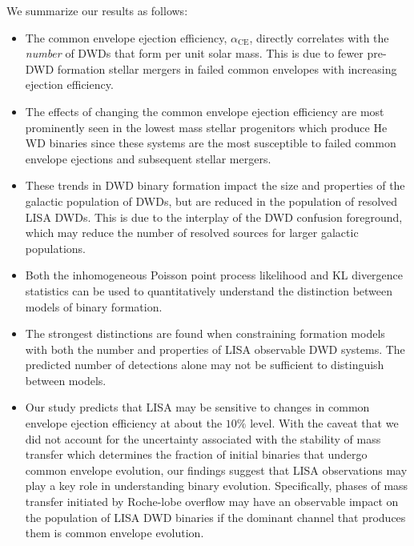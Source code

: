 \documentclass[twocolumn]{aastex631}
\newcommand*{\alphaCE}{\alpha_{\mathrm{CE}}}
\begin{document}
We summarize our results as follows:
\begin{itemize}
    \item The common envelope ejection efficiency, $\alphaCE{}$, 
        directly correlates with the \emph{number} of DWDs that 
        form per unit solar mass. This is due to fewer pre-DWD 
        formation stellar mergers in failed common envelopes with 
        increasing ejection efficiency.
    \item The effects of changing the common envelope ejection efficiency 
        are most prominently seen in the lowest mass stellar progenitors 
        which produce He WD binaries since these systems are the most 
        susceptible to failed common envelope ejections and subsequent 
        stellar mergers.
    \item These trends in DWD binary formation
            impact the size and properties of the galactic 
            population of DWDs, 
        but are reduced in the population of resolved LISA DWDs.
        This is due to the interplay of the DWD confusion foreground,
            which may reduce the number of resolved sources
            for larger galactic populations. 
    \item Both the inhomogeneous Poisson point process likelihood and
        KL divergence statistics can be used to quantitatively understand
        the distinction between models of binary formation.
    \item The strongest distinctions are found when constraining formation
        models with both the
        number and properties of LISA observable DWD systems.
        The predicted number of detections alone may not be sufficient to
        distinguish between models.
\item Our study predicts that LISA may be sensitive to changes 
        in common envelope ejection efficiency at about the $10\%$
        level.
    With the caveat that we did not account for the uncertainty associated with 
        the stability of mass transfer which determines the fraction 
        of initial binaries that undergo common envelope evolution, 
        our findings suggest that LISA observations may play 
        a key role in understanding binary evolution.
    Specifically, phases of mass transfer initiated by Roche-lobe 
        overflow may have an observable impact on the population of
        LISA DWD binaries if the dominant channel that 
        produces them is common envelope evolution.
\end{itemize}    
\end{document}
